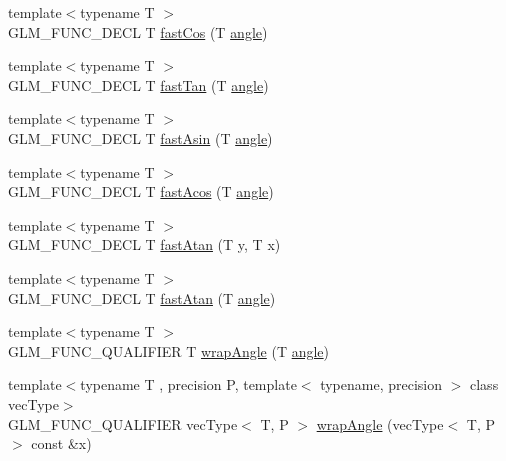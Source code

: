 \begin{DoxyCompactItemize}
\item 
{\footnotesize template$<$typename T $>$ }\\G\+L\+M\+\_\+\+F\+U\+N\+C\+\_\+\+D\+E\+C\+L T \hyperlink{group__gtx__fast__trigonometry_gab34c8b45c23c0165a64dcecfcc3b302a}{fast\+Cos} (T \hyperlink{group__gtc__quaternion_gad4a4448baedb198b2b1e7880d2544dc9}{angle})
\item 
{\footnotesize template$<$typename T $>$ }\\G\+L\+M\+\_\+\+F\+U\+N\+C\+\_\+\+D\+E\+C\+L T \hyperlink{group__gtx__fast__trigonometry_gaf29b9c1101a10007b4f79ee89df27ba2}{fast\+Tan} (T \hyperlink{group__gtc__quaternion_gad4a4448baedb198b2b1e7880d2544dc9}{angle})
\item 
{\footnotesize template$<$typename T $>$ }\\G\+L\+M\+\_\+\+F\+U\+N\+C\+\_\+\+D\+E\+C\+L T \hyperlink{group__gtx__fast__trigonometry_ga562cb62c51fbfe7fac7db0bce706b81f}{fast\+Asin} (T \hyperlink{group__gtc__quaternion_gad4a4448baedb198b2b1e7880d2544dc9}{angle})
\item 
{\footnotesize template$<$typename T $>$ }\\G\+L\+M\+\_\+\+F\+U\+N\+C\+\_\+\+D\+E\+C\+L T \hyperlink{group__gtx__fast__trigonometry_ga9721d63356e5d94fdc4b393a426ab26b}{fast\+Acos} (T \hyperlink{group__gtc__quaternion_gad4a4448baedb198b2b1e7880d2544dc9}{angle})
\item 
{\footnotesize template$<$typename T $>$ }\\G\+L\+M\+\_\+\+F\+U\+N\+C\+\_\+\+D\+E\+C\+L T \hyperlink{group__gtx__fast__trigonometry_ga8d197c6ef564f5e5d59af3b3f8adcc2c}{fast\+Atan} (T y, T x)
\item 
{\footnotesize template$<$typename T $>$ }\\G\+L\+M\+\_\+\+F\+U\+N\+C\+\_\+\+D\+E\+C\+L T \hyperlink{group__gtx__fast__trigonometry_gae25de86a968490ff56856fa425ec9d30}{fast\+Atan} (T \hyperlink{group__gtc__quaternion_gad4a4448baedb198b2b1e7880d2544dc9}{angle})
\item 
{\footnotesize template$<$typename T $>$ }\\G\+L\+M\+\_\+\+F\+U\+N\+C\+\_\+\+Q\+U\+A\+L\+I\+F\+I\+E\+R T \hyperlink{group__gtx__fast__trigonometry_ga069527c6dbd64f53435b8ebc4878b473}{wrap\+Angle} (T \hyperlink{group__gtc__quaternion_gad4a4448baedb198b2b1e7880d2544dc9}{angle})
\item 
{\footnotesize template$<$typename T , precision P, template$<$ typename, precision $>$ class vec\+Type$>$ }\\G\+L\+M\+\_\+\+F\+U\+N\+C\+\_\+\+Q\+U\+A\+L\+I\+F\+I\+E\+R vec\+Type$<$ T, P $>$ \hyperlink{namespaceglm_a643ff6d35f2ea3652029cf4197ca900e}{wrap\+Angle} (vec\+Type$<$ T, P $>$ const \&x)

\end{DoxyCompactItemize}
